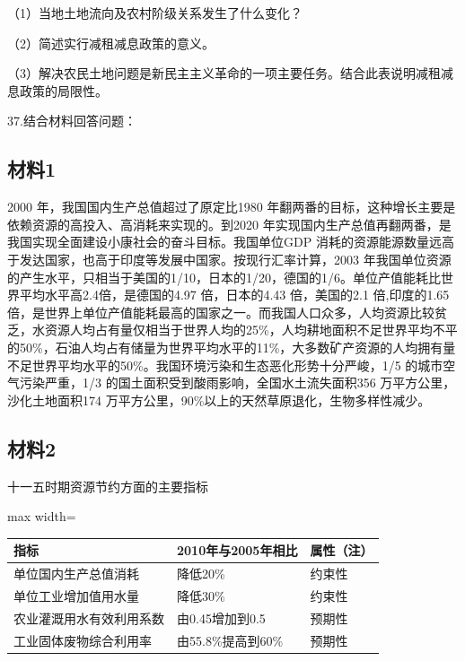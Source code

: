 \documentclass[UTF8,11pt]{ctexart}
\begin{document}
（1）当地土地流向及农村阶级关系发生了什么变化？


（2）简述实行减租减息政策的意义。


（3）解决农民土地问题是新民主主义革命的一项主要任务。结合此表说明减租减息政策的局限性。


37.结合材料回答问题：


\subsection*{材料1}

2000 年，我国国内生产总值超过了原定比1980 年翻两番的目标，这种增长主要是依赖资源的高投入、高消耗来实现的。到2020 年实现国内生产总值再翻两番，是我国实现全面建设小康社会的奋斗目标。我国单位GDP 消耗的资源能源数量远高于发达国家，也高于印度等发展中国家。按现行汇率计算，2003 年我国单位资源的产生水平，只相当于美国的1/10，日本的1/20，德国的1/6。单位产值能耗比世界平均水平高2.4倍，是德国的4.97 倍，日本的4.43 倍，美国的2.1 倍,印度的1.65 倍，是世界上单位产值能耗最高的国家之一。而我国人口众多，人均资源比较贫乏，水资源人均占有量仅相当于世界人均的25\%，人均耕地面积不足世界平均不平的50\%，石油人均占有储量为世界平均水平的11\%，大多数矿产资源的人均拥有量不足世界平均水平的50\%。我国环境污染和生态恶化形势十分严峻，1/5 的城市空气污染严重，1/3 的国土面积受到酸雨影响，全国水土流失面积356 万平方公里，沙化土地面积174 万平方公里，90\%以上的天然草原退化，生物多样性减少。


\subsection*{材料2}

十一五时期资源节约方面的主要指标


\begin{center}\begin{adjustbox}{max width=\linewidth}\begin{tabular}{|>{\raggedright\arraybackslash}p{\dimexpr(\linewidth-6\tabcolsep-4\arrayrulewidth)/3\relax}|>{\raggedright\arraybackslash}p{\dimexpr(\linewidth-6\tabcolsep-4\arrayrulewidth)/3\relax}|>{\raggedright\arraybackslash}p{\dimexpr(\linewidth-6\tabcolsep-4\arrayrulewidth)/3\relax}|}\hline
指标 & 2010年与2005年相比 & 属性（注）\\\hline
单位国内生产总值消耗 & 降低20\% & 约束性\\\hline
单位工业增加值用水量 & 降低30\% & 约束性\\\hline
农业灌溉用水有效利用系数 & 由0.\allowbreak{}45增加到0.\allowbreak{}5 & 预期性\\\hline
工业固体废物综合利用率 & 由55.\allowbreak{}8\%提高到60\% & 预期性\\\hline\end{tabular}\end{adjustbox}\end{center}
\end{document}

